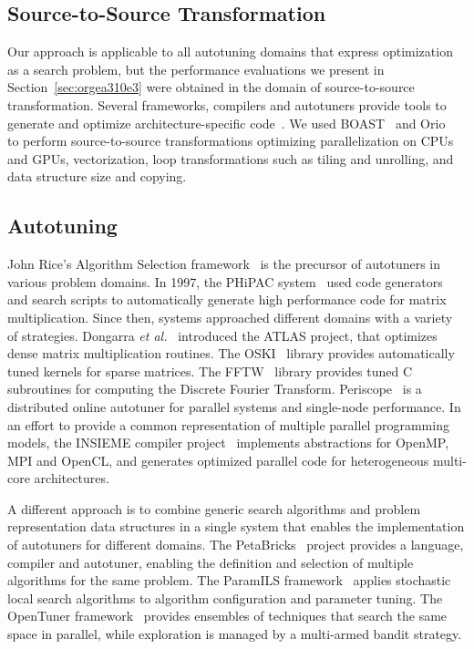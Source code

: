 \documentclass[conference]{IEEEtran}
\begin{document}
\subsection{Source-to-Source Transformation}
\label{sec:org634d642}
Our approach is applicable to all autotuning domains that express optimization
as a search problem, but the performance evaluations we present in
Section~\ref{sec:orgea310e3} were obtained in the domain of
source-to-source transformation. Several frameworks, compilers and autotuners
provide tools to generate and optimize architecture-specific
code~\cite{hartono2009annotation,videau2017boast,tiwari2009scalable,yi2007poet,ansel2009petabricks}.
We used BOAST~\cite{videau2017boast} and
Orio~\cite{hartono2009annotation} to perform source-to-source
transformations optimizing parallelization on CPUs and GPUs, vectorization, loop
transformations such as tiling and unrolling, and data structure size and
copying.
\subsection{Autotuning}
\label{sec:org42b6d6f}
John Rice's Algorithm Selection framework~\cite{rice1976algorithm} is the
precursor of autotuners in various problem domains. In 1997, the PHiPAC
system~\cite{bilmes1997optimizing} used code generators and search scripts
to automatically generate high performance code for matrix multiplication. Since
then, systems approached different domains with a variety of strategies.
Dongarra \emph{et al.}~\cite{dongarra1998automatically} introduced the ATLAS
project, that optimizes dense matrix multiplication routines. The
OSKI~\cite{vuduc2005oski} library provides automatically tuned kernels for
sparse matrices. The FFTW~\cite{frigo1998fftw} library provides tuned C
subroutines for computing the Discrete Fourier Transform.
Periscope~\cite{gerndt2010automatic} is a distributed online autotuner for
parallel systems and single-node performance. In an effort to provide a common
representation of multiple parallel programming models, the INSIEME compiler
project~\cite{jordan2012multi} implements abstractions for OpenMP, MPI and
OpenCL, and generates optimized parallel code for heterogeneous multi-core
architectures.

A different approach is to combine generic search algorithms and problem
representation data structures in a single system that enables the
implementation of autotuners for different domains. The
PetaBricks~\cite{ansel2009petabricks} project provides a language,
compiler and autotuner, enabling the definition and selection of multiple
algorithms for the same problem. The ParamILS
framework~\cite{hutter2009paramils} applies stochastic local search
algorithms to algorithm configuration and parameter tuning. The OpenTuner
framework~\cite{ansel2014opentuner} provides ensembles of techniques that
search the same space in parallel, while exploration is managed by a multi-armed
bandit strategy.
\end{document}

